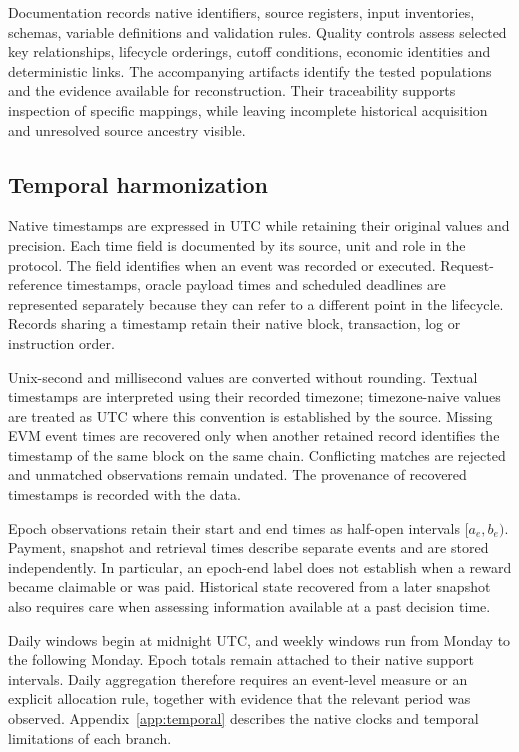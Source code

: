 

Documentation records native identifiers, source registers, input inventories, schemas, variable definitions and validation rules. Quality controls assess selected key relationships, lifecycle orderings, cutoff conditions, economic identities and deterministic links. The accompanying artifacts identify the tested populations and the evidence available for reconstruction. Their traceability supports inspection of specific mappings, while leaving incomplete historical acquisition and unresolved source ancestry visible.

\subsection{Temporal harmonization}
\label{sec:temporal}

Native timestamps are expressed in UTC while retaining their original values and precision. Each time field is documented by its source, unit and role in the protocol. The field  identifies when an event was recorded or executed. Request-reference timestamps, oracle payload times and scheduled deadlines are represented separately because they can refer to a different point in the lifecycle. Records sharing a timestamp retain their native block, transaction, log or instruction order.

Unix-second and millisecond values are converted without rounding. Textual timestamps are interpreted using their recorded timezone; timezone-naive values are treated as UTC where this convention is established by the source. Missing EVM event times are recovered only when another retained record identifies the timestamp of the same block on the same chain. Conflicting matches are rejected and unmatched observations remain undated. The provenance of recovered timestamps is recorded with the data.

Epoch observations retain their start and end times as half-open intervals $[a_e,b_e)$. Payment, snapshot and retrieval times describe separate events and are stored independently. In particular, an epoch-end label does not establish when a reward became claimable or was paid. Historical state recovered from a later snapshot also requires care when assessing information available at a past decision time.

Daily windows begin at midnight UTC, and weekly windows run from Monday to the following Monday. Epoch totals remain attached to their native support intervals. Daily aggregation therefore requires an event-level measure or an explicit allocation rule, together with evidence that the relevant period was observed. Appendix~\ref{app:temporal} describes the native clocks and temporal limitations of each branch.


